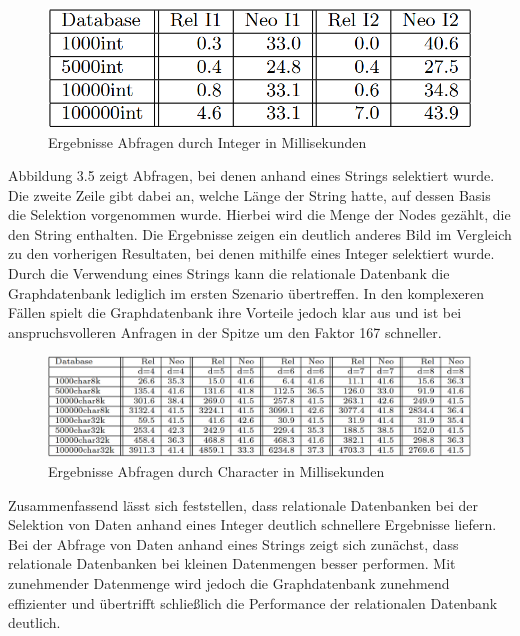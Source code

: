  \citep{graphrelationaldb}
\begin{figure}[H]
	\centering
	\includegraphics[scale=.5]{Illustrations/dbresultsint.png}
	\caption{Ergebnisse Abfragen durch Integer in Millisekunden \citep{graphrelationaldb}}
\end{figure}
\noindent
Abbildung 3.5 zeigt Abfragen, bei denen anhand eines Strings selektiert wurde. Die zweite Zeile gibt dabei an, welche Länge der String hatte, auf dessen Basis die Selektion vorgenommen wurde. Hierbei wird die Menge der Nodes gezählt, die den String enthalten. Die Ergebnisse zeigen ein deutlich anderes Bild im Vergleich zu den vorherigen Resultaten, bei denen mithilfe eines Integer selektiert wurde. Durch die Verwendung eines Strings kann die relationale Datenbank die Graphdatenbank lediglich im ersten Szenario übertreffen. In den komplexeren Fällen spielt die Graphdatenbank ihre Vorteile jedoch klar aus und ist bei anspruchsvolleren Anfragen in der Spitze um den Faktor 167 schneller.
 \citep{graphrelationaldb}
\begin{figure}[H]
	\centering
	\includegraphics[scale=.425]{Illustrations/dbresultschar.png}
	\caption{Ergebnisse Abfragen durch Character  in Millisekunden \citep{graphrelationaldb}}
\end{figure}
\noindent
Zusammenfassend lässt sich feststellen, dass relationale Datenbanken bei der Selektion von Daten anhand eines Integer deutlich schnellere Ergebnisse liefern. Bei der Abfrage von Daten anhand eines Strings zeigt sich zunächst, dass relationale Datenbanken bei kleinen Datenmengen besser performen. Mit zunehmender Datenmenge wird jedoch die Graphdatenbank zunehmend effizienter und übertrifft schließlich die Performance der relationalen Datenbank deutlich.
